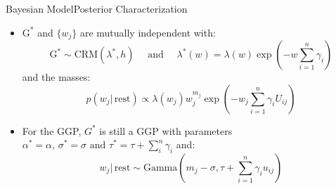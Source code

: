 \documentclass[aspectratio=169,xcolor=dvipsnames]{beamer}
\begin{document}
\begin{frame}{Bayesian Model}{Posterior Characterization}
\setlength{\leftmargini}{0.2cm}
\begin{itemize}[<+->]
    \item $\text{G}^{*}$ and $\{w_j\}$ are mutually independent with:
    $$
    \text{G}^{*} \sim \text{CRM}(\lambda^{*}, h) \quad \text{ and } \quad \lambda^{*}(w) = \lambda(w) \exp(-w\sum_{i=1}^{n}\gamma_{i})
    $$
    and the masses:
    $$
    p(w_{j}| \, \text{rest}) \propto \lambda(w_{j}) w_{j}^{m_{j}} \exp(-w_{j} \sum_{i=1}^{n}\gamma_{i}U_{ij})
    $$
    
    \item For the GGP, $ G^{*}$ is still a GGP with parameters $\alpha^{*}=\alpha,\, \sigma^{*}= \sigma \text{ and } \tau^{*} = \tau +\sum_i^{n}\gamma_{i}$ and:
    $$
    w_{j}| \, \text{rest} \sim \text{Gamma}(m_{j} - \sigma, \tau + \sum_{i=1}^{n}\gamma_i u_{ij} )
    $$
\end{itemize}
\end{frame}
\end{document}
